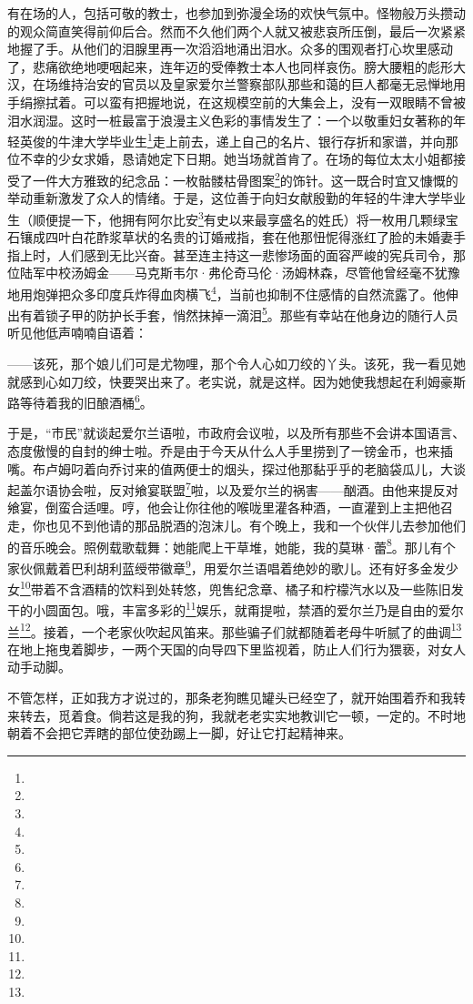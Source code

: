 有在场的人，包括可敬的教士，也参加到弥漫全场的欢快气氛中。怪物般万头攒动的观众简直笑得前仰后合。然而不久他们两个人就又被悲哀所压倒，最后一次紧紧地握了手。从他们的泪腺里再一次滔滔地涌出泪水。众多的围观者打心坎里感动了，悲痛欲绝地哽咽起来，连年迈的受俸教士本人也同样哀伤。膀大腰粗的彪形大汉，在场维持治安的官员以及皇家爱尔兰警察部队那些和蔼的巨人都毫无忌惮地用手绢擦拭着。可以蛮有把握地说，在这规模空前的大集会上，没有一双眼睛不曾被泪水润湿。这时一桩最富于浪漫主义色彩的事情发生了：一个以敬重妇女著称的年轻英俊的牛津大学毕业生\footnote{}走上前去，递上自己的名片、银行存折和家谱，并向那位不幸的少女求婚，恳请她定下日期。她当场就首肯了。在场的每位太太小姐都接受了一件大方雅致的纪念品：一枚骷髅枯骨图案\footnote{}的饰针。这一既合时宜又慷慨的举动重新激发了众人的情绪。于是，这位善于向妇女献殷勤的年轻的牛津大学毕业生（顺便提一下，他拥有阿尔比安\footnote{}有史以来最享盛名的姓氏）将一枚用几颗绿宝石镶成四叶白花酢浆草状的名贵的订婚戒指，套在他那忸怩得涨红了脸的未婚妻手指上时，人们感到无比兴奋。甚至连主持这一悲惨场面的面容严峻的宪兵司令，那位陆军中校汤姆金——马克斯韦尔·弗伦奇马伦·汤姆林森，尽管他曾经毫不犹豫地用炮弹把众多印度兵炸得血肉横飞\footnote{}，当前也抑制不住感情的自然流露了。他伸出有着锁子甲的防护长手套，悄然抹掉一滴泪\footnote{}。那些有幸站在他身边的随行人员听见他低声喃喃自语着：
\par ——该死，那个娘儿们可是尤物哩，那个令人心如刀绞的丫头。该死，我一看见她就感到心如刀绞，快要哭出来了。老实说，就是这样。因为她使我想起在利姆豪斯路等待着我的旧酿酒桶\footnote{}。
\par 于是，“市民”就谈起爱尔兰语啦，市政府会议啦，以及所有那些不会讲本国语言、态度傲慢的自封的绅士啦。乔是由于今天从什么人手里捞到了一镑金币，也来插嘴。布卢姆叼着向乔讨来的值两便士的烟头，探过他那黏乎乎的老脑袋瓜儿，大谈起盖尔语协会啦，反对飨宴联盟\footnote{}啦，以及爱尔兰的祸害——酗酒。由他来提反对飨宴，倒蛮合适哩。哼，他会让你往他的喉咙里灌各种酒，一直灌到上主把他召走，你也见不到他请的那品脱酒的泡沫儿。有个晚上，我和一个伙伴儿去参加他们的音乐晚会。照例载歌载舞：她能爬上干草堆，她能，我的莫琳·蕾\footnote{}。那儿有个家伙佩戴着巴利胡利蓝绶带徽章\footnote{}，用爱尔兰语唱着绝妙的歌儿。还有好多金发少女\footnote{}带着不含酒精的饮料到处转悠，兜售纪念章、橘子和柠檬汽水以及一些陈旧发干的小圆面包。哦，丰富多彩的\footnote{}娱乐，就甭提啦，禁酒的爱尔兰乃是自由的爱尔兰\footnote{}。接着，一个老家伙吹起风笛来。那些骗子们就都随着老母牛听腻了的曲调\footnote{}在地上拖曳着脚步，一两个天国的向导四下里监视着，防止人们行为猥亵，对女人动手动脚。
\par 不管怎样，正如我方才说过的，那条老狗瞧见罐头已经空了，就开始围着乔和我转来转去，觅着食。倘若这是我的狗，我就老老实实地教训它一顿，一定的。不时地朝着不会把它弄瞎的部位使劲踢上一脚，好让它打起精神来。
